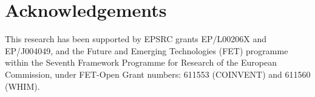 \documentclass[letterpaper]{article}
\newcommand*{\sourceatright}[1]{\unskip\hspace{1em plus 1fill}%
\nolinebreak[3]\hspace*{\fill}\mbox{#1}}%
\begin{document}








 




\section*{Acknowledgements} \label{sec:acknowledgements}
This research has been supported by EPSRC grants EP/L00206X and
EP/J004049, and the Future and Emerging Technologies (FET) programme
within the Seventh Framework Programme for Research of the European
Commission, under FET-Open Grant numbers: 611553 (COINVENT) and 611560
(WHIM).

\printbibliography
\end{document}
